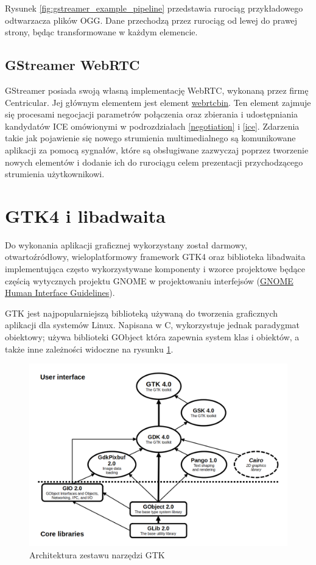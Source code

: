 Rysunek \ref{fig:gstreamer_example_pipeline} przedstawia rurociąg przykładowego odtwarzacza plików
OGG. Dane przechodzą przez rurociąg od lewej do prawej strony, będąc transformowane w każdym
elemencie.

\subsection{GStreamer WebRTC}
\label{gstreamer_webrtc}

GStreamer posiada swoją własną implementację WebRTC, wykonaną przez firmę Centricular. Jej głównym
elementem jest element
\href{https://gstreamer.freedesktop.org/documentation/webrtc/index.html?gi-language=c}{webrtcbin}.
Ten element zajmuje się procesami negocjacji parametrów połączenia oraz zbierania i udostępniania
kandydatów ICE omówionymi w podrozdziałach \ref{negotiation} i \ref{ice}. Zdarzenia takie jak
pojawienie się nowego strumienia multimedialnego są komunikowane aplikacji za pomocą sygnałów, które
są obsługiwane zazwyczaj poprzez tworzenie nowych elementów i dodanie ich do rurociągu celem
prezentacji przychodzącego strumienia użytkownikowi.

\section{GTK4 i libadwaita}

Do wykonania aplikacji graficznej wykorzystany został darmowy, otwartoźródłowy, wieloplatformowy
framework GTK4 oraz biblioteka libadwaita implementująca często wykorzystywane komponenty i wzorce
projektowe będące częścią wytycznych projektu GNOME w projektowaniu interfejsów
(\href{https://developer.gnome.org/hig/}{GNOME Human Interface Guidelines}).

GTK jest najpopularniejszą biblioteką używaną do tworzenia graficznych aplikacji dla systemów Linux.
Napisana w C, wykorzystuje jednak paradygmat obiektowy; używa biblioteki GObject która zapewnia
system klas i obiektów, a także inne zależności widoczne na rysunku \ref{fig:gtk_toolkit}.

\begin{figure}[H]
    \centering
    \includegraphics[width=.7\textwidth]{img/gtk-toolkit}
    \caption{Architektura zestawu narzędzi GTK}
    \label{fig:gtk_toolkit}
\end{figure}

